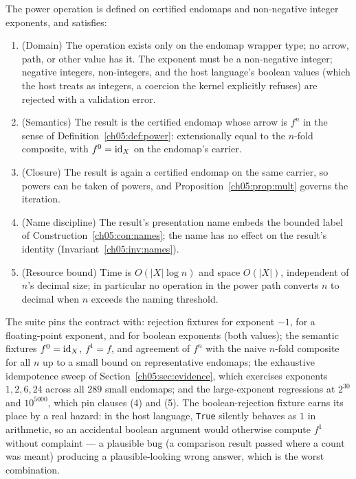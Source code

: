 \begin{invariant}
\label{ch05:inv:power}
The power operation is defined on certified endomaps and non-negative
integer exponents, and satisfies:
\begin{enumerate}
\item \textup{(Domain)} The operation exists only on the endomap wrapper
type; no arrow, path, or other value has it. The exponent must be a
non-negative integer; negative integers, non-integers, and the host
language's boolean values (which the host treats as integers, a coercion
the kernel explicitly refuses) are rejected with a validation error.
\item \textup{(Semantics)} The result is the certified endomap whose
arrow is $f^{n}$ in the sense of Definition~\ref{ch05:def:power}:
extensionally equal to the $n$-fold composite, with $f^{0} = \mathrm{id}_X$ on
the endomap's carrier.
\item \textup{(Closure)} The result is again a certified endomap on the
same carrier, so powers can be taken of powers, and
Proposition~\ref{ch05:prop:mult} governs the iteration.
\item \textup{(Name discipline)} The result's presentation name embeds
the bounded label of Construction~\ref{ch05:con:names}; the name has no
effect on the result's identity (Invariant~\ref{ch05:inv:names}).
\item \textup{(Resource bound)} Time is $O(|X| \log n)$ and space
$O(|X|)$, independent of $n$'s decimal size; in particular no operation
in the power path converts $n$ to decimal when $n$ exceeds the naming
threshold.
\end{enumerate}
\end{invariant}

\begin{checkclass}
\label{ch05:check:power}
The suite pins the contract with: rejection fixtures for exponent $-1$,
for a floating-point exponent, and for boolean exponents (both values);
the semantic fixtures $f^{0} = \mathrm{id}_X$, $f^{1} = f$, and agreement of
$f^{n}$ with the naive $n$-fold composite for all $n$ up to a small bound
on representative endomaps; the exhaustive idempotence sweep of
Section~\ref{ch05:sec:evidence}, which exercises exponents $1, 2, 6, 24$
across all $289$ small endomaps; and the large-exponent regressions at
$2^{30}$ and $10^{5000}$, which pin clauses (4) and (5). The
boolean-rejection fixture earns its place by a real hazard: in the host
language, \texttt{True} silently behaves as $1$ in arithmetic, so an
accidental boolean argument would otherwise compute $f^{1}$ without
complaint --- a plausible bug (a comparison result passed where a count
was meant) producing a plausible-looking wrong answer, which is the worst
combination.
\end{checkclass}


